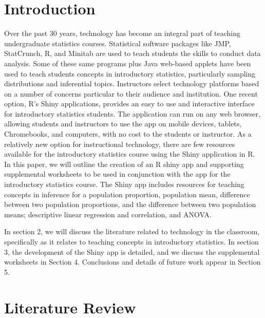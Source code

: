 \documentclass[11pt]{book}
\begin{document}
\newpage
\tableofcontents
\renewcommand\thechapter{\arabic{chapter}}
\renewcommand\thesection{\arabic{section}}

\newpage
\section{Introduction}
Over the past 30 years, technology has become an integral part of teaching undergraduate statistics courses. Statistical software packages like JMP, StatCrunch, R, and Minitab are used to teach students the skills to conduct data analysis. Some of these same programs plus Java web-based applets have been used to teach students concepts in introductory statistics, particularly sampling distributions and inferential topics. Instructors select technology platforms based on a number of concerns particular to their audience and institution. One recent option, R's Shiny applications, provides an easy to use and interactive interface for introductory statistics students. The application can run on any web browser, allowing students and instructors to use the app on mobile devices, tablets, Chromebooks, and computers, with no cost to the students or instructor. As a relatively new option for instructional technology, there are few resources available for the introductory statistics course using the Shiny application in R. In this paper, we will outline the creation of an R shiny app and supporting supplemental worksheets to be used in conjunction with the app for the introductory statistics course. The Shiny app includes resources for teaching concepts in inference for a population proportion, population mean, difference between two population proportions, and the difference between two population means; descriptive linear regression and correlation, and ANOVA.

In section 2, we will discuss the literature related to technology in the classroom, specifically as it relates to teaching concepts in introductory statistics. In section 3, the development of the Shiny app is detailed, and we discuss the supplemental worksheets in Section 4. Conclusions and details of future work appear in Section 5.
 
\section{Literature Review}
	   	
\end{document}
